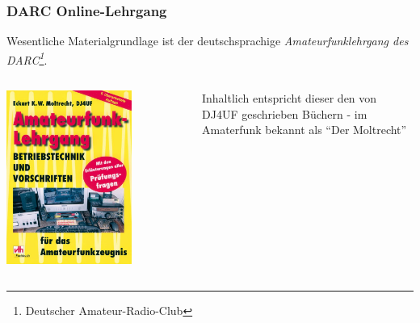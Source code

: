 \begin{frame}
    \frametitle{DARC Online-Lehrgang}

    Wesentliche Materialgrundlage ist der deutschsprachige
    \emph{Amateurfunklehrgang \hyperlink{refs}{\cite{darc}} des
    DARC\footnote{Deutscher Amateur-Radio-Club}}.

    \begin{columns}[c]
        \column[c]{5cm}
        \begin{center}
            \includegraphics[width=0.7\textwidth]{e00/Amateurfunklehrgang-Betriebstechnik-und-Vorschriften.jpg}
            \tiny \hyperlink{refs}{\cite{darcv}}
        \end{center}
        \column{5cm}
            Inhaltlich entspricht dieser den von DJ4UF geschrieben Büchern - im
            Amaterfunk bekannt als "`Der Moltrecht"' \hyperlink{refs}{\cite{dj4uf}}
    \end{columns}

\end{frame}


